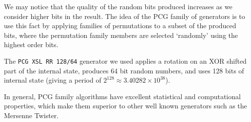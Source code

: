 \documentclass[10pt, a4paper]{article}
\begin{document}
We may notice that the quality of the random bits produced increases as we consider higher bits
in the result\cite{pcg}. The idea of the PCG family of generators is to use this fact by
applying families of permutations to a subset of the produced bits, where the permutation family
members are selected `randomly' using the highest order bits.

The \texttt{PCG XSL RR 128/64} generator we used applies a rotation on an XOR shifted part of the
internal state, produces 64 bit random numbers, and uses 128 bits of internal state (giving a
period of $2^{128} \approx 3.40282\times10^{38}$)\cite{pcg}.

In general, PCG family algorithms have excellent statistical and computational properties,
which make them superior to other well known generators such as the Mersenne Twister\cite{pcg}.
\end{document}
